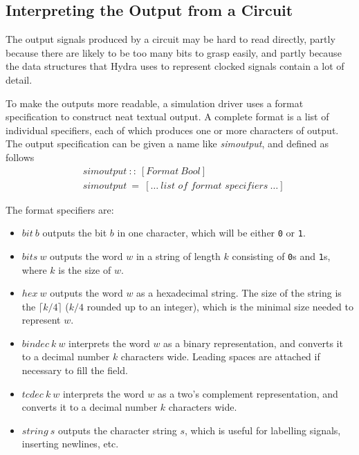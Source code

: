 \documentclass[a4paper,openany,fleqn]{book}
\begin{document}
\subsection{Interpreting the Output from a Circuit}
\label{sec:interpr-outp-from}

The output signals produced by a circuit may be hard to read directly,
partly because there are likely to be too many bits to grasp easily,
and partly because the data structures that Hydra uses to represent
clocked signals contain a lot of detail.

To make the outputs more readable, a simulation driver uses a format
specification to construct neat textual output.  A complete format is
a list of individual specifiers, each of which produces one or more
characters of output. The output specification can be given a name
like \textit{simoutput}, and defined as follows
\begin{align*}
  & \mathit{simoutput}\ ::\ [\mathit{Format}\ \mathit{Bool}] \\
  & \mathit{simoutput}\ =\ [\ldots\ \textit{list of format specifiers}\ \ldots]
\end{align*}

The format specifiers are:

\begin{itemize}
\item $\mathit{bit}\ b$ outputs the bit $b$ in one character, which
  will be either \texttt{0} or \texttt{1}.
\item $\mathit{bits}\ w$ outputs the word $w$ in a string of length
  $k$ consisting of \texttt{0}s and \texttt{1}s, where $k$ is the size
  of $w$.
\item $\mathit{hex}\ w$ outputs the word $w$ as a hexadecimal string.
  The size of the string is the $\lceil k/4 \rceil$ ($k/4$ rounded up
  to an integer), which is the minimal size needed to represent $w$.
\item $\mathit{bindec}\ k\ w$ interprets the word $w$ as a binary
  representation, and converts it to a decimal number $k$ characters
  wide.  Leading spaces are attached if necessary to fill the field.
\item $\mathit{tcdec}\ k\ w$ interprets the word $w$ as a two's
  complement representation, and converts it to a decimal number $k$
  characters wide.
\item $\mathit{string}\ s$ outputs the character string $s$, which is
  useful for labelling signals, inserting newlines, etc.
\end{itemize}
\end{document}

